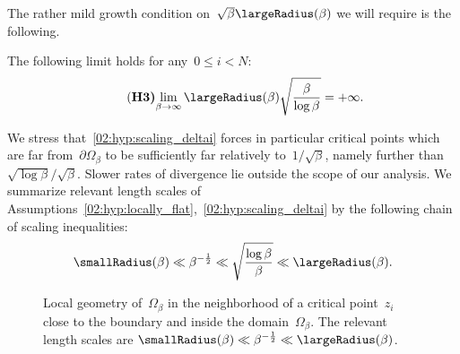     The rather mild growth condition on~$\sqrt\beta\largeRadius(\beta)$ we will require is the following.
    \begin{hypothesis}
        The following limit holds for any~$0\leq i<N$:
        \begin{equation}
            \tag{\bf H3}
            \label{02:hyp:scaling_deltai}
            \underset{\beta\to\infty}{\lim}\, \largeRadius(\beta)\sqrt{\frac{\beta}{\log\beta}}= +\infty.
        \end{equation}
    \end{hypothesis}

    We stress that~\eqref{02:hyp:scaling_deltai} forces in particular critical points which are far from~$\partial \Omega_\beta$ to be sufficiently far relatively to~$1/\sqrt\beta$, namely further than~$\sqrt{\log \beta}/\sqrt{\beta}$. Slower rates of divergence lie outside the scope of our analysis.
    We summarize relevant length scales of Assumptions~\eqref{02:hyp:locally_flat},~\eqref{02:hyp:scaling_deltai} by the following chain of scaling inequalities:
    \begin{equation}
        \label{02:eq:scaling_inequalities}
        \smallRadius(\beta)\ll \beta^{-\frac12} \ll \sqrt{\frac{\log \beta}{\beta}} \ll \largeRadius(\beta) .
    \end{equation}
    \begin{figure}
    \center        
        \caption[Main geometric assumption in~\cite{BLS25a}]{\label{02:fig:local_neighborhood}
        Local geometry of~$\Omega_\beta$ in the neighborhood of a critical point~$z_i$ close to the boundary and inside the domain~$\Omega_\beta$. The relevant length scales are $\smallRadius(\beta)\ll \beta^{-\frac12} \ll \largeRadius(\beta)$.
        }
    \end{figure}
